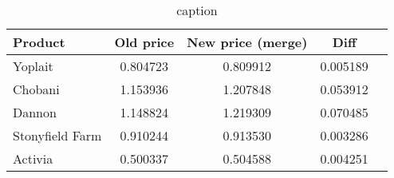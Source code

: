 \begin{table}[H]
\centering
\caption{{{caption}}}
\begin{tabular}{lcccc}
\toprule
Product & Old price & New price (merge) & Diff \\
\midrule
Yoplait & 0.804723 & 0.809912 & 0.005189 \\
Chobani & 1.153936 & 1.207848 & 0.053912 \\
Dannon & 1.148824 & 1.219309 & 0.070485 \\
Stonyfield Farm & 0.910244 & 0.913530 & 0.003286 \\
Activia & 0.500337 & 0.504588 & 0.004251 \\
\bottomrule
\end{tabular}
\label{tab:q16_merge_c1t1}
\end{table}
